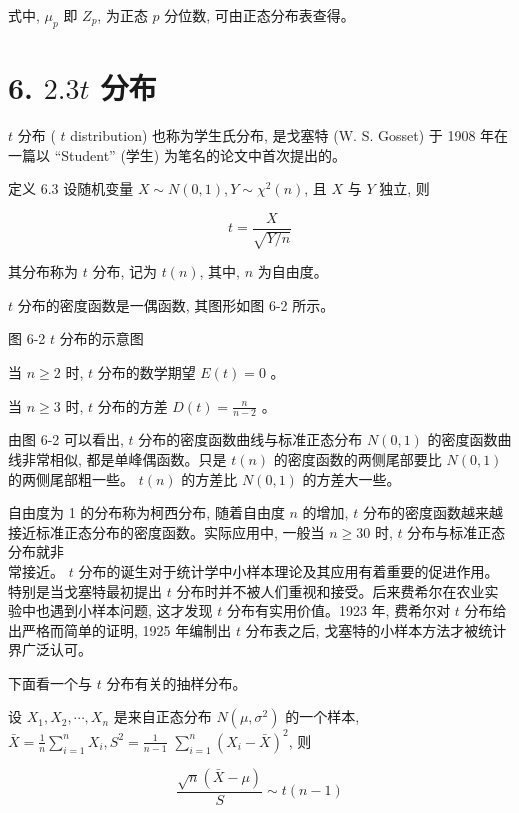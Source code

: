 \documentclass[10pt]{article}
\begin{document}
\begin{CJK*}{UTF8}{bsmi}
式中, $\mu_{p}$ 即 $Z_{p}$, 为正态 $p$ 分位数, 可由正态分布表查得。

\section*{6. $2.3 t$ 分布}
$t$ 分布 ( $t$ distribution) 也称为学生氏分布, 是戈塞特 (W. S. Gosset) 于 1908 年在一篇以 “Student” (学生) 为笔名的论文中首次提出的。

定义 6.3 设随机变量 $X \sim N(0,1), Y \sim \chi^{2}(n)$, 且 $X$ 与 $Y$ 独立, 则


\begin{equation*}
t=\frac{X}{\sqrt{Y / n}} \tag{6.2}
\end{equation*}


其分布称为 $t$ 分布, 记为 $t(n)$, 其中, $n$ 为自由度。

$t$ 分布的密度函数是一偶函数, 其图形如图 6-2 所示。

\begin{center}
\end{center}

图 6-2 $t$ 分布的示意图

当 $n \geqslant 2$ 时, $t$ 分布的数学期望 $E(t)=0$ 。

当 $n \geqslant 3$ 时, $t$ 分布的方差 $D(t)=\frac{n}{n-2}$ 。

由图 6-2 可以看出, $t$ 分布的密度函数曲线与标准正态分布 $N(0,1)$ 的密度函数曲线非常相似, 都是单峰偶函数。只是 $t(n)$ 的密度函数的两侧尾部要比 $N(0,1)$ 的两侧尾部粗一些。 $t(n)$ 的方差比 $N(0,1)$ 的方差大一些。

自由度为 1 的分布称为柯西分布, 随着自由度 $n$ 的增加, $t$ 分布的密度函数越来越接近标准正态分布的密度函数。实际应用中, 一般当 $n \geqslant 30$ 时, $t$ 分布与标准正态分布就非\\
常接近。 $t$ 分布的诞生对于统计学中小样本理论及其应用有着重要的促进作用。特别是当戈塞特最初提出 $t$ 分布时并不被人们重视和接受。后来费希尔在农业实验中也遇到小样本问题, 这才发现 $t$ 分布有实用价值。1923 年, 费希尔对 $t$ 分布给出严格而简单的证明, 1925 年编制出 $t$ 分布表之后, 戈塞特的小样本方法才被统计界广泛认可。

下面看一个与 $t$ 分布有关的抽样分布。

设 $X_{1}, X_{2}, \cdots, X_{n}$ 是来自正态分布 $N\left(\mu, \sigma^{2}\right)$ 的一个样本, $\bar{X}=\frac{1}{n} \sum_{i=1}^{n} X_{i}, S^{2}=\frac{1}{n-1}$ $\sum_{i=1}^{n}\left(X_{i}-\bar{X}\right)^{2}$, 则


\begin{equation*}
\frac{\sqrt{n}(\bar{X}-\mu)}{S} \sim t(n-1) \tag{6.3}
\end{equation*}



\end{CJK*}
\end{document}
